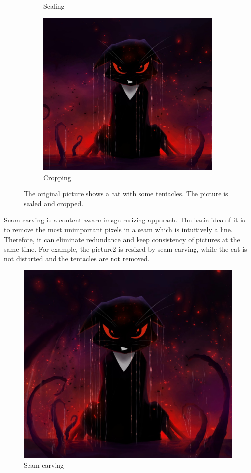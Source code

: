 \documentclass[final]{cvpr}
\begin{document}
\begin{figure}[htb]
\begin{center}
\begin{subfigure}[b]{0.48\linewidth}
    \caption{Scaling}
\end{subfigure}
\begin{subfigure}[b]{0.48\linewidth}
    \includegraphics[width=\textwidth]{gibbous_cropping.jpg}
    \caption{Cropping}
\end{subfigure}
\end{center}
\caption{The original picture shows a cat with some tentacles. The picture is scaled and cropped.}
\label{fig:gibbous_scale_crop}
\end{figure}

Seam carving is a content-aware image resizing apporach.
The basic idea of it is to remove the most unimportant pixels in a seam which is intuitively a line.
Therefore, it can eliminate redundance and keep consistency of pictures at the same time.
For example, the picture\ref{fig:gibbous_seam_carve} is resized by seam carving, while the cat is not distorted and the tentacles are not removed.
\begin{figure}[htb]
\begin{center}
    \includegraphics[width=0.48\linewidth]{gibbous_seam_carving.jpg}
\end{center}
\caption{Seam carving}
\label{fig:gibbous_seam_carve}
\end{figure}
\end{document}

